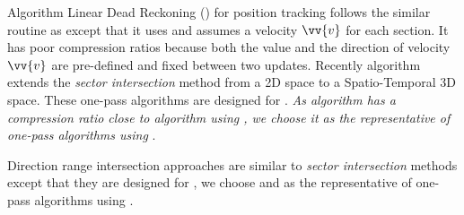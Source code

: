 Algorithm Linear Dead Reckoning (\ldr) for position tracking \cite{Lange:Tracking,Trajcevski:DDR} follows the similar routine as \rwa except that it uses \sed and assumes a velocity ${\vv{v}}$ for each section.
It has poor compression ratios because both the value and the direction of velocity ${\vv{v}}$ are pre-defined and fixed between two updates.
Recently algorithm \cised~\cite{Lin:Cised} extends the \textit{sector intersection} method \siped from a 2D space to a Spatio-Temporal 3D space.
These one-pass algorithms are designed for \sed. {\em As algorithm \cised has a compression ratio close to algorithm \dpa using \sed, we choose it as the representative of one-pass algorithms using \sed}.



{Direction range intersection} approaches are similar to  \emph{sector intersection} methods except that they are designed for \dad, we choose \intersec \cite{Long:Direction} and \interval \cite{Ke:Interval} as the representative of one-pass algorithms using \dad.



